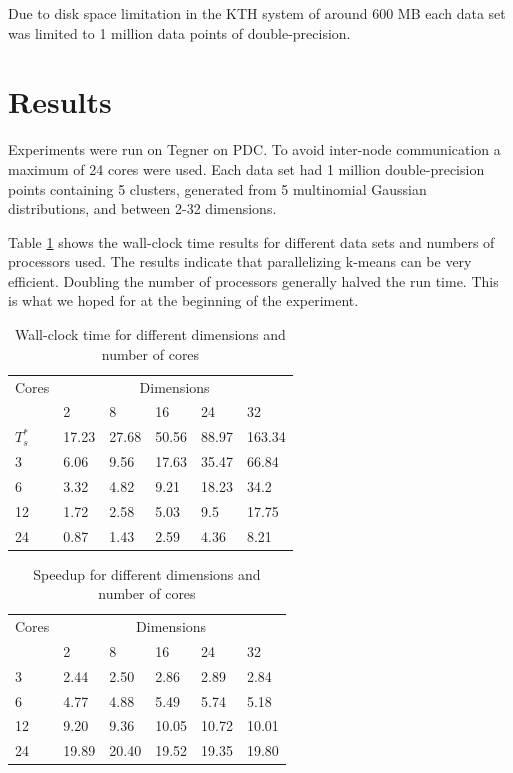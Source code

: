 \documentclass[parskip=true]{scrartcl}
\begin{document}
Due to disk space limitation in the KTH system of around 600 MB each data set was limited to 1 million data points of double-precision. 


\section{Results}
Experiments were run on Tegner on PDC. To avoid inter-node communication a maximum of 24 cores were used. Each data set had 1 million double-precision points containing 5 clusters, generated from 5 multinomial Gaussian distributions, and between 2-32 dimensions.

Table \ref{tab:wallclock} shows the wall-clock time results for different data sets and numbers of processors used. The results indicate that parallelizing k-means can be very efficient. Doubling the number of processors generally halved the run time. This is what we hoped for at the beginning of the experiment.

\begin{table}[ht]
\centering
\caption{Wall-clock time for different dimensions and number of cores}
\label{tab:wallclock}
\begin{tabular}{@{}llllll@{}}
\toprule
Cores & \multicolumn{5}{c}{Dimensions} \\ 
      \cmidrule{2-6}
                & 2   & 8   & 16   & 24   & 32   \\ \midrule
$T^*_s$ & 17.23  & 27.68   & 50.56   & 88.97    & 163.34   \\
3 & 6.06	&	9.56	&	17.63	&	35.47	&	66.84 \\
6 & 3.32	&	4.82	&	9.21	&	18.23	&	34.2 \\
12 & 1.72	&	2.58	&	5.03	&	9.5	&	17.75 \\
24 & 0.87	&	1.43	&	2.59	&	4.36	&	8.21 \\ \bottomrule
\end{tabular}
\end{table}


\begin{table}[ht]
\centering
\caption{Speedup for different dimensions and number of cores}
\label{speedup}
\begin{tabular}{@{}llllll@{}}
\toprule
Cores & \multicolumn{5}{c}{Dimensions} \\ 
      \cmidrule{2-6}
                & 2   & 8   & 16   & 24   & 32   \\ \midrule
3  & 2.44 &  2.50 &  2.86 &  2.89  &  2.84 \\
6  &  4.77 &  4.88 &  5.49 &  5.74 &  5.18 \\
12 &  9.20 &  9.36 & 10.05  & 10.72  & 10.01  \\
24 & 19.89  & 20.40   & 19.52  & 19.35 & 19.80  \\\bottomrule
\end{tabular}
\end{table}
\end{document}
